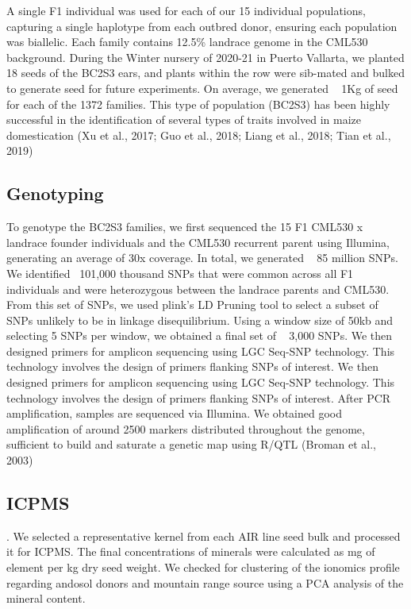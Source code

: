 A single F1 individual was used for each of our 15 individual populations, capturing a single haplotype from each outbred donor, ensuring each population was biallelic. Each family contains 12.5\% landrace genome in the CML530 background. During the Winter nursery of 2020-21 in Puerto Vallarta, we planted 18 seeds of the BC2S3 ears, and plants within the row were sib-mated and bulked to generate seed for future experiments. On average, we generated ~ 1Kg of seed for each of the 1372 families.
This type of population (BC2S3) has been highly successful in the identification of several types of traits involved in maize domestication (Xu et al., 2017; Guo et al., 2018; Liang et al., 2018; Tian et al., 2019) 

\subsection{Genotyping}
 To genotype the BC2S3 families, we first sequenced the 15 F1 CML530 x landrace founder individuals and the CML530 recurrent parent using Illumina, generating an average of 30x coverage. In total, we generated ~ 85 million SNPs.
 We identified ~101,000 thousand SNPs that were common across all F1 individuals and were heterozygous between the landrace parents and CML530. From this set of SNPs, we used plink's LD Pruning tool to select a subset of SNPs unlikely to be in linkage disequilibrium. Using a window size of 50kb and selecting 5 SNPs per window,  we obtained a final set of ~ 3,000 SNPs.
 We then designed primers for amplicon sequencing using LGC Seq-SNP technology. This technology involves the design of primers flanking SNPs of interest.
 We then designed primers for amplicon sequencing using LGC Seq-SNP technology.
 This technology involves the design of primers flanking SNPs of interest.
 After PCR amplification, samples are sequenced via Illumina. We obtained good amplification of around 2500 markers distributed throughout the genome, sufficient to build and saturate a genetic map using R/QTL (Broman et al., 2003)

\subsection{ICPMS}.
We selected a representative kernel from each AIR line seed bulk and processed it for ICPMS.
The final concentrations of minerals were calculated as mg of element per kg dry seed weight. We checked for clustering of the ionomics profile regarding andosol donors and mountain range source using a PCA analysis of the mineral content.

